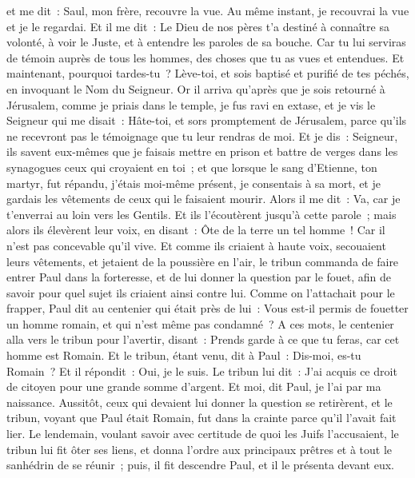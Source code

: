 \begin{multicols}{2}
et me dit~: Saul, mon frère, recouvre la vue. Au même instant, je recouvrai la vue et je le regardai.
Et il me dit~: Le Dieu de nos pères t'a destiné à connaître sa volonté, à voir le Juste, et à entendre les paroles de sa bouche.
Car tu lui serviras de témoin auprès de tous les hommes, des choses que tu as vues et entendues.
Et maintenant, pourquoi tardes-tu~? Lève-toi, et sois baptisé et purifié de tes péchés, en invoquant le Nom du Seigneur.
Or il arriva qu'après que je sois retourné à Jérusalem, comme je priais dans le temple, je fus ravi en extase,
et je vis le Seigneur qui me disait~: Hâte-toi, et sors promptement de Jérusalem, parce qu'ils ne recevront pas le témoignage que tu leur rendras de moi.
Et je dis~: Seigneur, ils savent eux-mêmes que je faisais mettre en prison et battre de verges dans les synagogues ceux qui croyaient en toi~;
et que lorsque le sang d'Etienne, ton martyr, fut répandu, j'étais moi-même présent, je consentais à sa mort, et je gardais les vêtements de ceux qui le faisaient mourir.
Alors il me dit~: Va, car je t'enverrai au loin vers les Gentils.
Et ils l'écoutèrent jusqu'à cette parole~; mais alors ils élevèrent leur voix, en disant~: Ôte de la terre un tel homme~! Car il n'est pas concevable qu'il vive.
Et comme ils criaient à haute voix, secouaient leurs vêtements, et jetaient de la poussière en l'air,
le tribun commanda de faire entrer Paul dans la forteresse, et de lui donner la question par le fouet, afin de savoir pour quel sujet ils criaient ainsi contre lui.
Comme on l'attachait pour le frapper, Paul dit au centenier qui était près de lui~: Vous est-il permis de fouetter un homme romain, et qui n'est même pas condamné~?
A ces mots, le centenier alla vers le tribun pour l'avertir, disant~: Prends garde à ce que tu feras, car cet homme est Romain.
Et le tribun, étant venu, dit à Paul~: Dis-moi, es-tu Romain~? Et il répondit~: Oui, je le suis.
Le tribun lui dit~: J'ai acquis ce droit de citoyen pour une grande somme d'argent. Et moi, dit Paul, je l'ai par ma naissance.
Aussitôt, ceux qui devaient lui donner la question se retirèrent, et le tribun, voyant que Paul était Romain, fut dans la crainte parce qu'il l'avait fait lier.
Le lendemain, voulant savoir avec certitude de quoi les Juifs l'accusaient, le tribun lui fit ôter ses liens, et donna l'ordre aux principaux prêtres et à tout le sanhédrin de se réunir~; puis, il fit descendre Paul, et il le présenta devant eux.

\end{multicols}
